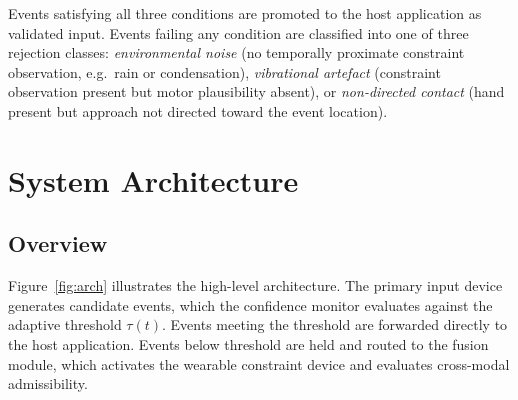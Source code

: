 \documentclass[11pt,letterpaper]{article}
\begin{document}
Events satisfying all three conditions are promoted to the host application as
validated input. Events failing any condition are classified into one of three
rejection classes: \emph{environmental noise} (no temporally proximate constraint
observation, e.g.\ rain or condensation), \emph{vibrational artefact} (constraint
observation present but motor plausibility absent), or \emph{non-directed contact}
(hand present but approach not directed toward the event location).

\section{System Architecture}
\label{sec:architecture}

\subsection{Overview}

Figure~\ref{fig:arch} illustrates the high-level architecture. The primary input
device generates candidate events, which the confidence monitor evaluates against
the adaptive threshold $\tau(t)$. Events meeting the threshold are forwarded
directly to the host application. Events below threshold are held and routed to
the fusion module, which activates the wearable constraint device and evaluates
cross-modal admissibility.
\end{document}
